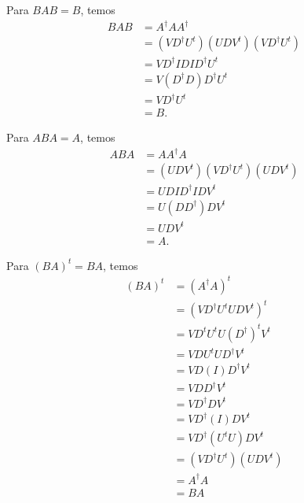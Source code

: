 \documentclass[a4paper,12pt, leqno, answers]{exam}
\begin{document}
\begin{questions}
\begin{solution}
        Para $B A B = B$, temos
        \begin{align*}
            B A B &= A^\dagger A A^\dagger \\
            &= \left( V D^\dagger U^t \right) \left( U D V^t \right) \left( V D^\dagger U^t \right) \\
            &= V D^\dagger I D I D^\dagger U^t \\
            &= V \left( D^\dagger D \right) D^\dagger U^t \\
            &= V D^\dagger U^t \\
            &= B.
        \end{align*}

        Para $A B A = A$, temos
        \begin{align*}
            A B A &= A A^\dagger A \\
            &= \left( U D V^t \right) \left( V D^\dagger U^t \right) \left( U D V^t \right) \\
            &= U D I D^\dagger I D V^t \\
            &= U \left( D D^\dagger \right) D V^t \\
            &= U D V^t \\
            &= A.
        \end{align*}

        Para $\left( B A \right)^t = B A$, temos
        \begin{align*}
            \left( B A \right)^t &= \left( A^\dagger A \right)^t \\
            &= \left( V D^\dagger U^t U D V^t \right)^t \\
            &= V D^t U^t U (D^\dagger)^t V^t \\
            &= V D U^t U D^\dagger V^t \\
            &= V D \left( I \right) D^\dagger V^t \\
            &= V D D^\dagger V^t \\
            &= V D^\dagger D V^t \\
            &= V D^\dagger \left( I \right) D V^t \\
            &= V D^\dagger \left( U^t U \right) D V^t \\
            &= \left( V D^\dagger U^t \right) \left( U D V^t \right) \\
            &= A^\dagger A \\
            &= B A
        \end{align*}


\end{solution}
\end{questions}
\end{document}

